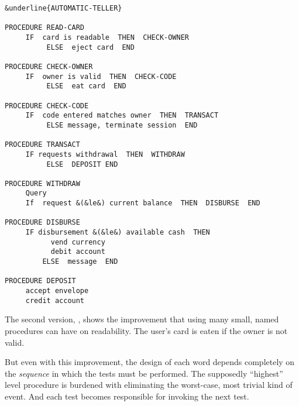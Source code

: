 \begin{figure*}[tttt]
\small\begin{center}
\begin{BVerbatim}[commandchars=\&\{\},baselinestretch=0.85]
&underline{AUTOMATIC-TELLER}

PROCEDURE READ-CARD
     IF  card is readable  THEN  CHECK-OWNER
          ELSE  eject card  END

PROCEDURE CHECK-OWNER
     IF  owner is valid  THEN  CHECK-CODE
          ELSE  eat card  END

PROCEDURE CHECK-CODE
     IF  code entered matches owner  THEN  TRANSACT
          ELSE message, terminate session  END

PROCEDURE TRANSACT
     IF requests withdrawal  THEN  WITHDRAW
          ELSE  DEPOSIT END

PROCEDURE WITHDRAW
     Query
     If  request &(&le&) current balance  THEN  DISBURSE  END

PROCEDURE DISBURSE
     IF disbursement &(&le&) available cash  THEN
           vend currency
           debit account
         ELSE  message  END

PROCEDURE DEPOSIT
     accept envelope
     credit account
\end{BVerbatim}
\end{center}
\end{figure*}
The second version, , shows the improvement that using many
small, named procedures can have on readability. The user's card is eaten
if the owner is not valid.

But even with this improvement, the design of each word depends completely
on the \emph{sequence} in which the tests must be performed. The
supposedly ``highest'' level procedure is burdened with eliminating the
worst-case, most trivial kind of event. And each test becomes responsible
for invoking the next test.

